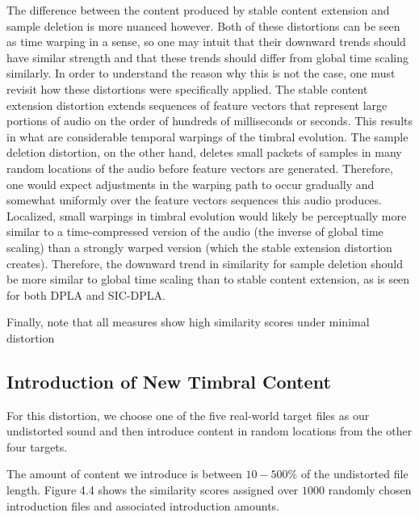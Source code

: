 \documentclass[a4paper,12pt]{report} 	%
\numberwithin{figure}{chapter}
\numberwithin{table}{chapter}
\numberwithin{equation}{chapter}
\begin{document}
\begin{flushleft}
The difference between the content produced by stable content extension and sample deletion is more nuanced however. Both of these distortions can be seen as time warping in a sense, so one may intuit that their downward trends should have similar strength and that these trends should differ from global time scaling similarly. In order to understand the reason why this is not the case, one must revisit how these distortions were specifically applied. The stable content extension distortion extends sequences of feature vectors that represent large portions of audio on the order of hundreds of milliseconds or seconds. This results in what are considerable temporal warpings of the timbral evolution. The sample deletion distortion, on the other hand, deletes small packets of samples in many random locations of the audio before feature vectors are generated. Therefore, one would expect adjustments in the warping path to occur gradually and somewhat uniformly over the feature vectors sequences this audio produces. Localized, small warpings in timbral evolution would likely be perceptually more similar to a time-compressed version of the audio (the inverse of global time scaling) than a strongly warped version (which the stable extension distortion creates). Therefore, the downward trend in similarity for sample deletion should be more similar to global time scaling than to stable content extension, as is seen for both DPLA and SIC-DPLA.

Finally, note that all measures show high similarity scores under minimal distortion

\subsection{Introduction of New Timbral Content}
For this distortion, we choose one of the five real-world target files as our undistorted sound and then introduce content in random locations from the other four targets. 

The amount of content we introduce is between $10-500\%$ of the undistorted file length. Figure 4.4 shows the similarity scores assigned over $1000$ randomly chosen introduction files and associated introduction amounts.


\end{flushleft}
\end{document}
